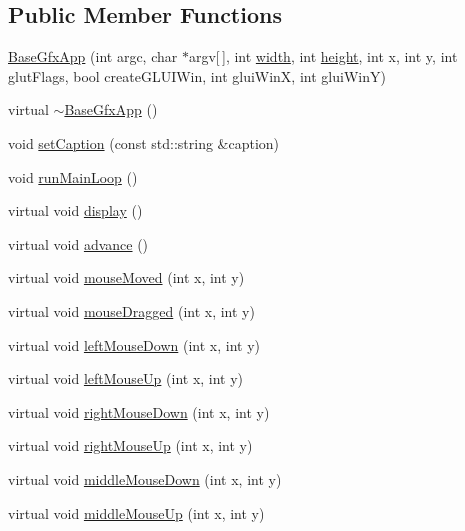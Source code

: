 \subsection*{Public Member Functions}
\begin{DoxyCompactItemize}
\item 
\hyperlink{classBaseGfxApp_a534a4b5293a35947fdae3805a103541d}{Base\-Gfx\-App} (int argc, char $\ast$argv\mbox{[}$\,$\mbox{]}, int \hyperlink{classBaseGfxApp_ace089a1a94fb6bb0bc17e1b7fa48e05d}{width}, int \hyperlink{classBaseGfxApp_aa253dbe16a20c40e0a1bf8ff942ceea3}{height}, int x, int y, int glut\-Flags, bool create\-G\-L\-U\-I\-Win, int glui\-Win\-X, int glui\-Win\-Y)
\item 
virtual \hyperlink{classBaseGfxApp_aceb6194bd818c0ffa980a6990fd03027}{$\sim$\-Base\-Gfx\-App} ()
\item 
void \hyperlink{classBaseGfxApp_a4b3b1a475b7f2babaf1b477c34b15fb1}{set\-Caption} (const std\-::string \&caption)
\item 
void \hyperlink{classBaseGfxApp_acda031916c00d56c2dc901e2653e3083}{run\-Main\-Loop} ()
\item 
virtual void \hyperlink{classBaseGfxApp_ac8de2d5a955582547af5619b771b4d6d}{display} ()
\item 
virtual void \hyperlink{classBaseGfxApp_a432317fc7c028b2c6702eb2232e85425}{advance} ()
\item 
virtual void \hyperlink{classBaseGfxApp_a0956b82d7fa58b623c498aea7073dbba}{mouse\-Moved} (int x, int y)
\item 
virtual void \hyperlink{classBaseGfxApp_abb23f716dd6612b3a72938e41525d338}{mouse\-Dragged} (int x, int y)
\item 
virtual void \hyperlink{classBaseGfxApp_aaaccf5a5e923a9465441a5ee712424a8}{left\-Mouse\-Down} (int x, int y)
\item 
virtual void \hyperlink{classBaseGfxApp_a0a2961a932b02b2f9d7d0bb408f6fb51}{left\-Mouse\-Up} (int x, int y)
\item 
virtual void \hyperlink{classBaseGfxApp_afa87e6a71220945e41f0424e540125d9}{right\-Mouse\-Down} (int x, int y)
\item 
virtual void \hyperlink{classBaseGfxApp_a812643d563522a993457dd565c33f8f6}{right\-Mouse\-Up} (int x, int y)
\item 
virtual void \hyperlink{classBaseGfxApp_a2c98cae9bb5ad1fb1832a6d4812670f8}{middle\-Mouse\-Down} (int x, int y)
\item 
virtual void \hyperlink{classBaseGfxApp_a00fc05e8d9629b72302b5adf014bdb0c}{middle\-Mouse\-Up} (int x, int y)

\end{DoxyCompactItemize}
